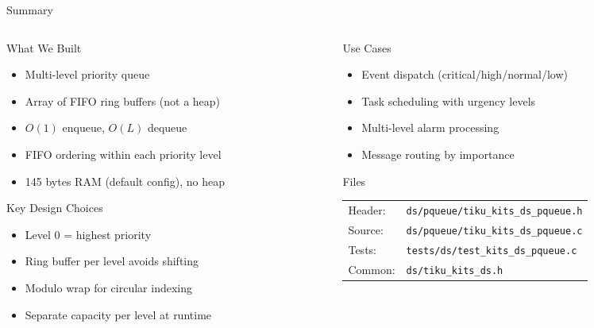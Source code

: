 \documentclass[aspectratio=169, 10pt]{beamer}
\begin{document}
\begin{frame}{Summary}
\begin{columns}[T]
\begin{column}{0.48\textwidth}
\begin{block}{What We Built}
\begin{itemize}
  \item Multi-level priority queue
  \item Array of FIFO ring buffers (not a heap)
  \item $O(1)$ enqueue, $O(L)$ dequeue
  \item FIFO ordering within each priority level
  \item 145 bytes RAM (default config), no heap
\end{itemize}
\end{block}

\begin{block}{Key Design Choices}
\begin{itemize}
  \item Level 0 = highest priority
  \item Ring buffer per level avoids shifting
  \item Modulo wrap for circular indexing
  \item Separate capacity per level at runtime
\end{itemize}
\end{block}
\end{column}

\begin{column}{0.48\textwidth}
\begin{block}{Use Cases}
\begin{itemize}
  \item Event dispatch (critical/high/normal/low)
  \item Task scheduling with urgency levels
  \item Multi-level alarm processing
  \item Message routing by importance
\end{itemize}
\end{block}

\begin{block}{Files}
\scriptsize
\begin{tabular}{@{}lp{4.5cm}@{}}
Header: & \texttt{ds/pqueue/tiku\_kits\_ds\_pqueue.h} \\
Source: & \texttt{ds/pqueue/tiku\_kits\_ds\_pqueue.c} \\
Tests: & \texttt{tests/ds/test\_kits\_ds\_pqueue.c} \\
Common: & \texttt{ds/tiku\_kits\_ds.h} \\
\end{tabular}
\end{block}
\end{column}
\end{columns}
\end{frame}
\end{document}
